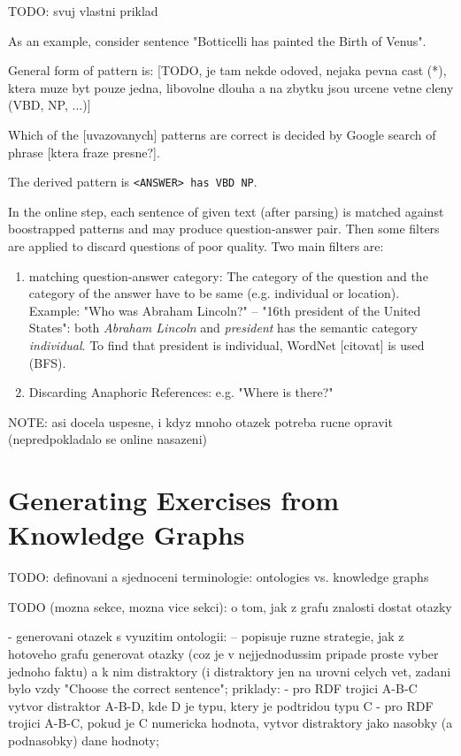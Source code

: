 \documentclass[a4paper, 12pt, twoside]{fithesis2}		%
\renewcommand{\_}{\leavevmode \kern0.0em\vbox{\hrule width0.4em}}
\begin{document}
TODO: svuj vlastni priklad

As an example, consider sentence "Botticelli has painted the Birth of Venus".

General form of pattern is: [TODO, je tam nekde odoved, nejaka pevna cast (*), ktera muze byt pouze jedna, libovolne dlouha a na zbytku jsou urcene vetne cleny (VBD, NP, ...)]

Which of the [uvazovanych] patterns are correct is decided by
Google search of phrase [ktera fraze presne?].

The derived pattern is \texttt{<ANSWER> has VBD NP}.



In the online step, each sentence of given text (after parsing) is matched against boostrapped patterns
and may produce question-answer pair.
Then some filters are applied to discard questions of poor quality. Two main filters are:

\begin{enumerate}
  \item matching question-answer category:
    The category of the question and the category of the answer have to be same (e.g. individual or location). Example: "Who was Abraham Lincoln?" -- "16th president of the United States": both \textit{Abraham Lincoln} and \textit{president} has the semantic category \textit{individual}.
    To find that president is individual, WordNet [citovat] is used (BFS).
  \item Discarding Anaphoric References: e.g. "Where is there?"
\end{enumerate}


NOTE: asi docela uspesne, i kdyz mnoho otazek potreba rucne opravit (nepredpokladalo se online nasazeni)



\section{Generating Exercises from Knowledge Graphs}
\label{sec:irt}

TODO: definovani a sjednoceni terminologie: ontologies vs. knowledge graphs

TODO (mozna sekce, mozna vice sekci): o tom, jak z grafu znalosti dostat otazky

- generovani otazek s vyuzitim ontologii:
\cite{question-gen-domain-ontologies} -- popisuje ruzne strategie, jak z hotoveho grafu generovat otazky (coz je v nejjednodussim pripade proste vyber jednoho faktu) a k nim distraktory (i distraktory jen na urovni celych vet, zadani bylo vzdy "Choose the correct sentence"; priklady:
- pro RDF trojici A-B-C vytvor distraktor A-B-D, kde D je typu, ktery je podtridou typu C
- pro RDF trojici A-B-C, pokud je C numericka hodnota, vytvor distraktory jako nasobky (a podnasobky) dane hodnoty;
\end{document}
